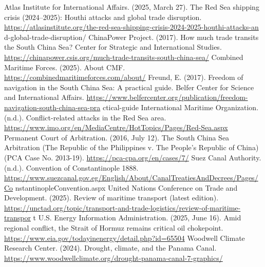 
\begin{referencelist}
   Atlas Institute for International Affairs. (2025, March 27). The Red Sea shipping crisis (2024–2025): Houthi attacks and global trade disruption. \url{https://atlasinstitute.org/the-red-sea-shipping-crisis-2024-2025-houthi-attacks-an} d-global-trade-disruption/
   ChinaPower Project. (2017). How much trade transits the South China Sea? Center for Strategic and International Studies. \url{https://chinapower.csis.org/much-trade-transits-south-china-sea/}
   Combined Maritime Forces. (2025). About CMF. \url{https://combinedmaritimeforces.com/about/}
   Freund, E. (2017). Freedom of navigation in the South China Sea: A practical guide. Belfer Center for Science and International Affairs. \url{https://www.belfercenter.org/publication/freedom-navigation-south-china-sea-pra} ctical-guide
   International Maritime Organization. (n.d.). Conflict-related attacks in the Red Sea area. \url{https://www.imo.org/en/MediaCentre/HotTopics/Pages/Red-Sea.aspx}
   Permanent Court of Arbitration. (2016, July 12). The South China Sea Arbitration (The Republic of the Philippines v. The People's Republic of China) (PCA Case No. 2013-19). \url{https://pca-cpa.org/en/cases/7/}
   Suez Canal Authority. (n.d.). Convention of Constantinople 1888. \url{https://www.suezcanal.gov.eg/English/About/CanalTreatiesAndDecrees/Pages/Co} nstantinopleConvention.aspx
   United Nations Conference on Trade and Development. (2025). Review of maritime transport (latest edition). \url{https://unctad.org/topic/transport-and-trade-logistics/review-of-maritime-transpor} t U.S.
   Energy Information Administration. (2025, June 16). Amid regional conflict, the Strait of Hormuz remains critical oil chokepoint. \url{https://www.eia.gov/todayinenergy/detail.php?id=65504}
   Woodwell Climate Research Center. (2024). Drought, climate, and the Panama Canal. \url{https://www.woodwellclimate.org/drought-panama-canal-7-graphics/}
\end{referencelist}
